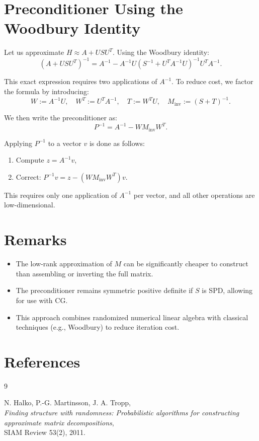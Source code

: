\documentclass{article}
\begin{document}
\section*{Preconditioner Using the Woodbury Identity}

Let us approximate $H \approx A + U S U^T$.
Using the Woodbury identity:
\[
(A + U S U^T)^{-1}
= A^{-1} - A^{-1} U (S^{-1} + U^T A^{-1} U)^{-1} U^T A^{-1}.
\]

This exact expression requires two applications of $A^{-1}$.
To reduce cost, we factor the formula by introducing:
\[
W := A^{-1} U,
\quad
W^T := U^T A^{-1},
\quad
T := W^T U,
\quad
M_{\text{inv}} := (S + T)^{-1}.
\]

We then write the preconditioner as:
\[
P^{-1} = A^{-1} - W M_{\text{inv}} W^T.
\]

Applying $P^{-1}$ to a vector $v$ is done as follows:
\begin{enumerate}
  \item Compute $z = A^{-1} v$,
  \item Correct: $P^{-1} v = z - (W M_{\text{inv}}W^T)v$.
\end{enumerate}

This requires only one application of $A^{-1}$ per vector, and all other operations are low-dimensional.

\section*{Remarks}

\begin{itemize}
  \item The low-rank approximation of $M$ can be significantly cheaper to construct than assembling or inverting the full matrix.
  \item The preconditioner remains symmetric positive definite if $S$ is SPD, allowing for use with CG.
  \item This approach combines randomized numerical linear algebra with classical techniques (e.g., Woodbury) to reduce iteration cost.
\end{itemize}

\section*{References}

\begin{thebibliography}{9}

N. Halko, P.-G. Martinsson, J. A. Tropp,\\
\textit{Finding structure with randomness: Probabilistic algorithms for constructing approximate matrix decompositions},\\
SIAM Review 53(2), 2011.

\end{thebibliography}
\end{document}
